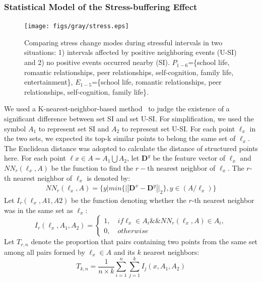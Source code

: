 \subsubsection{Statistical Model of the Stress-buffering Effect}
\begin{figure}
\centering
\texttt{[image: figs/gray/stress.eps]}
\caption{\small{Comparing stress change modes during stressful intervals in two situations:
1) intervals affected by positive neighboring events (U-SI) and 
2) no positive events occurred nearby (SI). 
$P_{1-6}$=\{school life, romantic relationships, peer relationships, self-cognition, family life, entertainment\},
$E_{1-5}$=\{school life, romantic relationships, peer relationships, self-cognition, family life\}.}}
\label{fig:stress}
\end{figure}
We used a K-nearest-neighbor-based method~\citep{Schilling1986Multivariate} 
to judge the existence of a significant difference between set SI and set U-SI. 
For simplification, we used the symbol $A_1$ to represent set SI and $A_2$ to represent set U-SI.
For each point $\ell_{x}$ in the two sets,
we expected its top-k similar points to belong the same set of $\ell_x$.
The Euclidean distance was adopted to calculate the distance of structured points here.
For each point $\ell x \in A=A_1\bigcup A_2$,
let $\textbf{D}^y$ be the feature vector of $\ell_x$ and $NN_r(\ell_x,A)$ be the function to find the $r-$th nearest neighbor of $\ell_x$.
The $r$-th nearest neighbor of $\ell_x$ is denoted by: 
\begin{equation}
\begin{aligned}
& NN_r(\ell_x,A) = \{y | min\{||\textbf{D}^x-\textbf{D}^y ||_2\}, y\in(A/\ell_x)\} &
\end{aligned}
\end{equation}
Let $I_r(\ell_x,A1,A2)$ be the function denoting whether the $r$-th nearest neighbor was in the same set as $\ell_x$:
\begin{equation}
I_r(\ell_x,A_1,A_2) =
\left\{ \begin{array}{ll}
1, \quad if \ell_x \in A_i  \&\& NN_r(\ell_x,A)\in A_i,\\
0, \quad otherwise
\end{array}
\right.
\end{equation}
Let $T_{r,n}$ denote the proportion that pairs containing two points from the same set among all pairs formed by $\ell_x \in A$ and its $k$ nearest neighbors:
\begin{equation}
T_{k,n}= \frac{1}{n\times k}\sum_{i=1}^{n}\sum_{j=1}^{k}I_j(x,A_1,A_2)
\end{equation}
